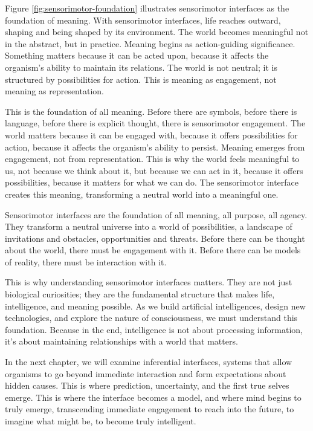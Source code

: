 \documentclass[
  openright]{book}
\begin{document}
Figure \ref{fig:sensorimotor-foundation} illustrates sensorimotor
interfaces as the foundation of meaning. With sensorimotor interfaces,
life reaches outward, shaping and being shaped by its environment. The
world becomes meaningful not in the abstract, but in practice. Meaning
begins as action-guiding significance. Something matters because it can
be acted upon, because it affects the organism's ability to maintain its
relations. The world is not neutral; it is structured by possibilities
for action. This is meaning as engagement, not meaning as
representation.

This is the foundation of all meaning. Before there are symbols, before
there is language, before there is explicit thought, there is
sensorimotor engagement. The world matters because it can be engaged
with, because it offers possibilities for action, because it affects the
organism's ability to persist. Meaning emerges from engagement, not from
representation. This is why the world feels meaningful to us, not
because we think about it, but because we can act in it, because it
offers possibilities, because it matters for what we can do. The
sensorimotor interface creates this meaning, transforming a neutral
world into a meaningful one.

Sensorimotor interfaces are the foundation of all meaning, all purpose,
all agency. They transform a neutral universe into a world of
possibilities, a landscape of invitations and obstacles, opportunities
and threats. Before there can be thought about the world, there must be
engagement with it. Before there can be models of reality, there must be
interaction with it.

This is why understanding sensorimotor interfaces matters. They are not
just biological curiosities; they are the fundamental structure that
makes life, intelligence, and meaning possible. As we build artificial
intelligences, design new technologies, and explore the nature of
consciousness, we must understand this foundation. Because in the end,
intelligence is not about processing information, it's about maintaining
relationships with a world that matters.

In the next chapter, we will examine inferential interfaces, systems
that allow organisms to go beyond immediate interaction and form
expectations about hidden causes. This is where prediction, uncertainty,
and the first true selves emerge. This is where the interface becomes a
model, and where mind begins to truly emerge, transcending immediate
engagement to reach into the future, to imagine what might be, to become
truly intelligent.
\end{document}
